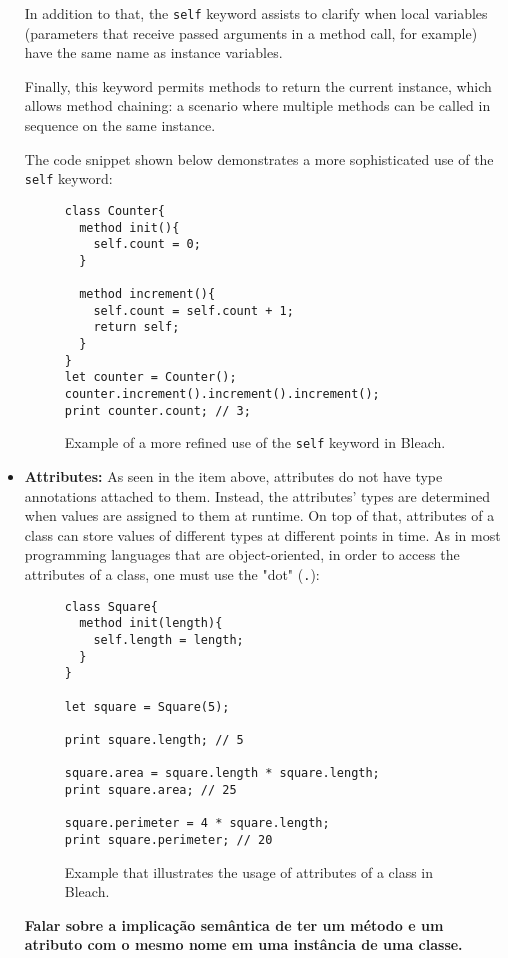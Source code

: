 \begin{itemize}
    In addition to that, the \texttt{self} keyword assists to clarify when local variables (parameters that receive passed arguments in a method call, for example) have the same name as instance variables.

    Finally, this keyword permits methods to return the current instance, which allows method chaining: a scenario where multiple methods can be called in sequence on the same instance.

    The code snippet shown below demonstrates a more sophisticated use of the \texttt{self} keyword:
\begin{figure}[H]
    \centering
    \begin{lstlisting}
class Counter{
  method init(){
    self.count = 0;
  }

  method increment(){
    self.count = self.count + 1;
    return self;
  }
}
let counter = Counter();
counter.increment().increment().increment();
print counter.count; // 3;
    \end{lstlisting}
    \caption{Example of a more refined use of the \texttt{self} keyword in Bleach.}
\end{figure}
    
    \item \textbf{Attributes:} As seen in the item above, attributes do not have type annotations attached to them. Instead, the attributes' types are determined when values are assigned to them at runtime. On top of that, attributes of a class can store values of different types at different points in time. As in most programming languages that are object-oriented, in order to access the attributes of a class, one must use the "dot" (\texttt{.}):
\begin{figure}[H]
    \centering
    \begin{lstlisting}
class Square{
  method init(length){
    self.length = length;
  }
}

let square = Square(5);

print square.length; // 5

square.area = square.length * square.length;
print square.area; // 25

square.perimeter = 4 * square.length;
print square.perimeter; // 20
    \end{lstlisting}
    \caption{Example that illustrates the usage of attributes of a class in Bleach.}
\end{figure}

    \textbf{Falar sobre a implicação semântica de ter um método e um atributo com o mesmo nome em uma instância de uma classe.}


\end{itemize}

